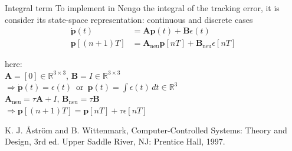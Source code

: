 \documentclass{beamer}
\begin{document}
\begin{frame}{Integral term}
    To implement in Nengo the integral of the tracking error, it is consider its state-space representation: continuous and discrete cases\footnotemark
\begin{align}
    \dot{\mathbf{p}}(t) &= \textbf{A} \mathbf{p}(t) + \textbf{B} \epsilon(t) \label{DynamicIntegrator}\\
    \mathbf{p}[(n+1)T] &= \textbf{A}_{\text{neu}} \mathbf{p}[nT]  + \textbf{B}_{\text{neu}} \epsilon[nT]
\end{align}

    \begin{tcolorbox}[
        tabularx = {l  },
        colback = morado!10,   %
        colframe = morado!80   %
    ]
        here:  \\
        \hline \hline
        $\textbf{A} = [0] \in \mathbb{R}^{3 \times 3}$, \(\textbf{B} = I \in \mathbb{R}^{3 \times 3}\)\\

         \(\Rightarrow  \dot{\mathbf{p}}(t) =  \epsilon(t) \, \,\, \text{or} \, \,\, \mathbf{p}(t) = \int \epsilon(t) \, dt \in \mathbb{R}^{3}\)  \\
         $\textbf{A}_{\text{neu}} = \tau \textbf{A} + I, \,    \textbf{B}_{\text{neu}} = \tau \textbf{B}$\\
         $\Rightarrow \mathbf{p}[(n+1)T] = \mathbf{p}[nT] + \tau \epsilon [nT]$\label{ItegraltermNeu}

    \end{tcolorbox}

     \tiny{\footnotemark[3]K. J. Åström and B. Wittenmark, Computer-Controlled Systems: Theory and Design, 3rd ed. Upper Saddle River, NJ: Prentice Hall, 1997.}


\end{frame}

\end{document}
